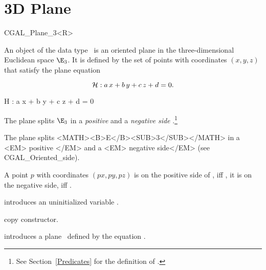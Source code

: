 
\cleardoublepage

\chapter{3D Plane}

\begin {classtemplate} {CGAL_Plane_3<R>}

An object  of the data type \classname\ is an oriented
plane in the three-dimensional Euclidean space $\E_3$. It is defined
by the set of points with coordinates  $(x,y,z)$ that satisfy the plane 
equation 

\begin{TexOnly}
\[{\cal H :}\;  a\, x +b\, y +c\, z + d = 0.\]
\end{TexOnly}
\begin{HtmlOnly}
H : a x + b y + c z + d = 0
\end{HtmlOnly}

\begin{TexOnly}%
The plane splits $\E_3$ in a {\em positive} and a {\em negative
side}%
.\footnote{See Section~\ref{Predicates} for the definition of .}
\end{TexOnly}
\begin{HtmlOnly}
The plane splits <MATH><B>E</B><SUB>3</SUB></MATH> in a <EM> positive
</EM> and a <EM> negative side</EM>
(see CGAL_Oriented_side).
\end{HtmlOnly}
A point $p$ with coordinates $(px, py, pz)$ is on the positive side of
, iff , it is on the
negative side, iff .



\creation
{}


\hidden {}
             {introduces an uninitialized variable \var.}

\hidden {}
 	    {copy constructor.}

{introduces a plane \var\ defined by the equation
 .}


\end{classtemplate}
